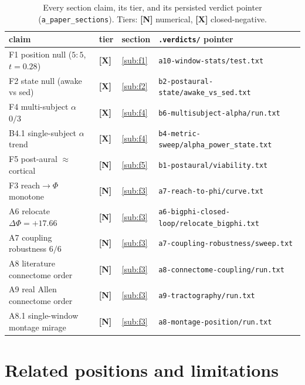 \documentclass[11pt,a4paper]{article}
\providecommand{\tierGreen}{\textbf{[N]}}   %
\providecommand{\tierRed}{\textbf{[X]}}     %
\begin{document}
\begin{table}[h]
\centering
\caption{Every section claim, its tier, and its persisted verdict pointer
(\texttt{a\_paper\_sections}). Tiers: \tierGreen{} numerical, \tierRed{}
closed-negative.}
\label{tab:matrix}
\small
\begin{tabular}{@{}llll@{}}
\toprule
claim & tier & section & \texttt{.verdicts/} pointer \\
\midrule
F1 position null ($5{:}5$, $t{=}0.28$) & \tierRed & \ref{sub:f1} &
\texttt{a10-window-stats/test.txt} \\
F2 state null (awake vs sed) & \tierRed & \ref{sub:f2} &
\texttt{b2-postaural-state/awake\_vs\_sed.txt} \\
F4 multi-subject $\alpha$ $0/3$ & \tierRed & \ref{sub:f4} &
\texttt{b6-multisubject-alpha/run.txt} \\
B4.1 single-subject $\alpha$ trend & \tierRed & \ref{sub:f4} &
\texttt{b4-metric-sweep/alpha\_power\_state.txt} \\
F5 post-aural $\approx$ cortical & \tierGreen & \ref{sub:f5} &
\texttt{b1-postaural/viability.txt} \\
F3 reach$\to\Phi$ monotone & \tierGreen & \ref{sub:f3} &
\texttt{a7-reach-to-phi/curve.txt} \\
A6 relocate $\Delta\Phi{=}{+}17.66$ & \tierGreen & \ref{sub:f3} &
\texttt{a6-bigphi-closed-loop/relocate\_bigphi.txt} \\
A7 coupling robustness $6/6$ & \tierGreen & \ref{sub:f3} &
\texttt{a7-coupling-robustness/sweep.txt} \\
A8 literature connectome order & \tierGreen & \ref{sub:f3} &
\texttt{a8-connectome-coupling/run.txt} \\
A9 real Allen connectome order & \tierGreen & \ref{sub:f3} &
\texttt{a9-tractography/run.txt} \\
A8.1 single-window montage mirage & \tierGreen & \ref{sub:f3} &
\texttt{a8-montage-position/run.txt} \\
\bottomrule
\end{tabular}
\end{table}

\section{Related positions and limitations}\label{sec:limits}
\end{document}
